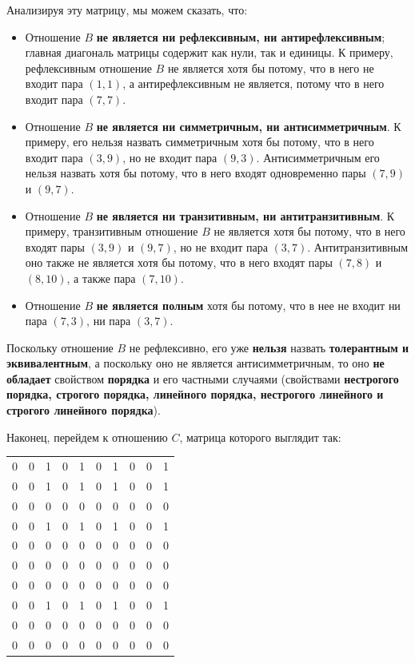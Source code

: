 \documentclass[12pt]{article}
\begin{document}
	Анализируя эту матрицу, мы можем сказать, что:
	\begin{itemize}
		\item{Отношение $B$ {\bf не является ни рефлексивным, ни антирефлексивным}; главная диагональ матрицы содержит как нули, так и единицы. К примеру, рефлексивным отношение $B$ не является хотя бы потому, что в него не входит пара $(1, 1)$, а антирефлексивным не является, потому что в него входит пара $(7, 7)$.}
		\item{Отношение $B$ {\bf не является ни симметричным, ни антисимметричным}. К примеру, его нельзя назвать симметричным хотя бы потому, что в него входит пара $(3, 9)$, но не входит пара $(9, 3)$. Антисимметричным его нельзя назвать хотя бы потому, что в него входят одновременно пары $(7, 9)$ и $(9, 7)$.}
		\item{Отношение $B$ {\bf не является ни транзитивным, ни антитранзитивным}. К примеру, транзитивным отношение $B$ не является хотя бы потому, что в него входят пары $(3, 9)$ и $(9, 7)$, но не входит пара $(3, 7)$. Антитранзитивным оно также не является хотя бы потому, что в него входят пары $(7, 8)$ и $(8, 10)$, а также пара $(7, 10)$.}
		\item{Отношение $B$ {\bf не является полным} хотя бы потому, что в нее не входит ни пара $(7, 3)$, ни пара $(3, 7)$.}
	\end{itemize}
	
	Поскольку отношение $B$ не рефлексивно, его уже {\bf нельзя} назвать {\bf толерантным и эквивалентным}, а поскольку оно не является антисимметричным, то оно {\bf не обладает} свойством {\bf порядка} и его частными случаями (свойствами {\bf нестрогого порядка, строгого порядка, линейного порядка, нестрогого линейного и строгого линейного порядка}). 
	
	Наконец, перейдем к отношению $C$, матрица которого выглядит так: 
	
	\begin{tabular} {c c c c c c c c c c}
		0 & 0 & 1 & 0 & 1 & 0 & 1 & 0 & 0 & 1 \\
		0 & 0 & 1 & 0 & 1 & 0 & 1 & 0 & 0 & 1 \\
		0 & 0 & 0 & 0 & 0 & 0 & 0 & 0 & 0 & 0 \\
		0 & 0 & 1 & 0 & 1 & 0 & 1 & 0 & 0 & 1 \\
		0 & 0 & 0 & 0 & 0 & 0 & 0 & 0 & 0 & 0 \\
		0 & 0 & 0 & 0 & 0 & 0 & 0 & 0 & 0 & 0 \\
		0 & 0 & 0 & 0 & 0 & 0 & 0 & 0 & 0 & 0 \\
		0 & 0 & 1 & 0 & 1 & 0 & 1 & 0 & 0 & 1 \\
		0 & 0 & 0 & 0 & 0 & 0 & 0 & 0 & 0 & 0 \\
		0 & 0 & 0 & 0 & 0 & 0 & 0 & 0 & 0 & 0 \\
	\end{tabular}
	
\end{document}
